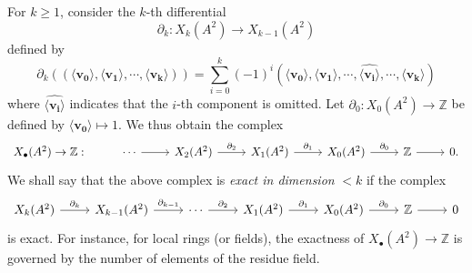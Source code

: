 \documentclass[11pt]{amsart}
\theoremstyle{definition}
\theoremstyle{plain}
\numberwithin{equation}{section}
\newcommand{\z}{\mathbb{Z}}
\newcommand{\lan}{\langle}
\newcommand{\ran}{\rangle}
\begin{document}
For $k\geq 1$, consider the $k$-th differential
\[
\partial_k:X_k(A^2)\to X_{k-1}(A^2)
\]
defined by
\[
\partial_k((\lan\pmb{v_0}\ran,\lan\pmb{v_1}\ran,\cdots,\lan\pmb{v_k}\ran))=\sum^k_{i=0}(-1)^i(\lan\pmb{v_0}\ran,\lan\pmb{v_1}\ran,\cdots,\hat{\lan\pmb{v_i}\ran},\cdots,\lan\pmb{v_k}\ran)
\]
where $\hat{\lan\pmb{v_i}\ran}$ indicates that the $i$-th component is omitted. Let $\partial_0:X_0(A^2)\to\z$ be defined by $\lan\pmb{v_0}\ran\mapsto 1$. We thus obtain the complex
\[
\begin{tikzcd}
X_{\bullet}(A^2)\to\z:& \cdots \ar[r] & X_2(A^2)\ar[r,"\partial_2"] & X_1(A^2)\ar[r,"\partial_1"] & X_0(A^2) \ar[r,"\partial_0"] & \z \ar[r] & 0.
\end{tikzcd}
\]
We shall say that the above complex is \textit{exact in dimension} $<k$ if the complex
\[
\begin{tikzcd}
    X_k(A^2)\ar[r,"\partial_k"] & X_{k-1}(A^2)\ar[r,"\partial_{k-1}"] & \cdots \ar[r,"\partial_2"] & X_1(A^2)\ar[r,"\partial_1"] & X_0(A^2) \ar[r,"\partial_0"] & \z \ar[r] & 0
\end{tikzcd}
\]
is exact. For instance, for local rings (or fields), the exactness of $X_{\bullet}(A^2)\to\z$ is governed by the number of elements of the residue field.
\end{document}
